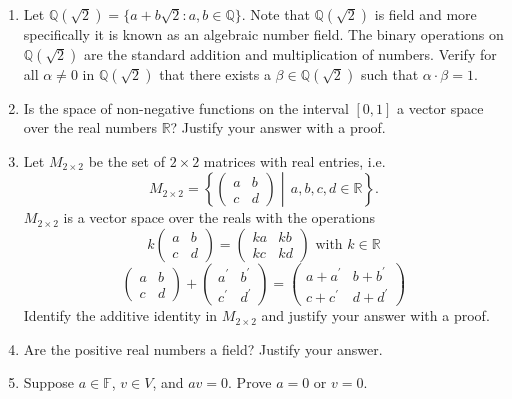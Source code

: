 \documentclass[12pt,letterpaper]{article}
\newcommand{\qq}{\mathbb Q}   %
\theoremstyle{plain}
\theoremstyle{definition}
\begin{document}
\begin{enumerate}[1.]
 \item Let $\qq(\sqrt{2})=\{a+b\sqrt{2} : a,b\in \mathbb{Q}\}$.  Note that $\qq(\sqrt{2})$ is field and more specifically it is known as an algebraic number field. The binary operations on $\qq(\sqrt{2})$ are the standard addition and multiplication of numbers. Verify for all $\alpha\neq 0$ in $\qq(\sqrt{2})$ that there exists a $\beta\in \qq(\sqrt{2})$ such that $\alpha \cdot \beta = 1$. \\

\item Is the space of non-negative functions on the interval $[0,1]$ a vector space over the real numbers $\mathbb{R}$? Justify your answer with a proof. 

\item Let $M_{2\times 2}$ be the set of $2\times 2$ matrices with real entries, i.e. 
\[M_{2\times 2}=\left\{ \begin{pmatrix}a & b \\ c & d\end{pmatrix} \middle| \, a,b, c,d\in \mathbb{R}\right\}.\]
$M_{2\times 2}$ is a vector space over the reals with the operations 
\[k \begin{pmatrix}a & b \\ c & d\end{pmatrix}= \begin{pmatrix}ka & kb \\ kc & kd\end{pmatrix} \text{ with }k\in \mathbb{R}\]
\[\begin{pmatrix}a & b \\ c & d\end{pmatrix}+\begin{pmatrix}a^\prime & b^\prime \\ c^\prime & d^\prime\end{pmatrix}= \begin{pmatrix}a+a^\prime & b+b^\prime \\ c+c^\prime & d+d^\prime\end{pmatrix}\]
Identify the additive identity in $M_{2\times 2}$ and justify your answer with a proof. 
\item Are the positive real numbers a field? Justify your answer. 
\item Suppose $a\in \mathbb{F}$, $v\in V$, and $av=0$. Prove $a=0$ or $v=0$. 
\end{enumerate}
\end{document}

